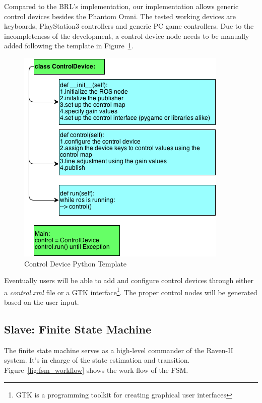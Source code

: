 \documentclass[letterpaper,twocolumn,10pt]{article}
\begin{document}
Compared to the BRL's implementation, our implementation allows
generic control devices besides the Phantom Omni. The tested working
devices are keyboards, PlayStation3 controllers and generic PC game
controllers. Due to the incompleteness of the development, a control
device node needs to be manually added following the template in
Figure~\ref{fig:control_device_template}.

\begin{figure}[h]
  \includegraphics[scale=0.6]{ControlDeviceTemplate.png}
  \caption{Control Device Python Template}
  \label{fig:control_device_template}
\end{figure}

Eventually users will be able to add and configure control devices
through either a \emph{control.xml} file or a GTK
interface\footnote{GTK is a programming toolkit for creating graphical
  user interfaces}. The proper control nodes will be generated based
on the user input.

\subsection{Slave: Finite State Machine}

The finite state machine serves as a high-level commander of the
Raven-II system. It's in charge of the state estimation and
transition. Figure~\ref{fig:fsm_workflow} shows the work flow of the FSM.
\end{document}
